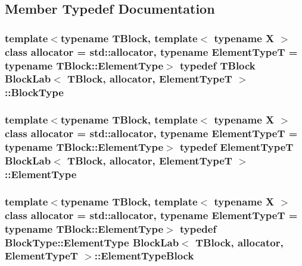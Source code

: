 \subsection{Member Typedef Documentation}
\hypertarget{class_block_lab_a745b3c9ac17f6743d11a7085196981a0}{}
\subsubsection[{Block\+Type}]{\setlength{\rightskip}{0pt plus 5cm}template$<$typename T\+Block, template$<$ typename X $>$ class allocator = std\+::allocator, typename Element\+Type\+T = typename T\+Block\+::\+Element\+Type$>$ typedef T\+Block {\bf Block\+Lab}$<$ T\+Block, allocator, Element\+Type\+T $>$\+::{\bf Block\+Type}\hspace{0.3cm}{\ttfamily [protected]}}\label{class_block_lab_a745b3c9ac17f6743d11a7085196981a0}
\hypertarget{class_block_lab_accdcd2d5e815a8497e5ef9ae884da6b6}{}
\subsubsection[{Element\+Type}]{\setlength{\rightskip}{0pt plus 5cm}template$<$typename T\+Block, template$<$ typename X $>$ class allocator = std\+::allocator, typename Element\+Type\+T = typename T\+Block\+::\+Element\+Type$>$ typedef Element\+Type\+T {\bf Block\+Lab}$<$ T\+Block, allocator, Element\+Type\+T $>$\+::{\bf Element\+Type}}\label{class_block_lab_accdcd2d5e815a8497e5ef9ae884da6b6}
\hypertarget{class_block_lab_ad547d74881a0d226a849e2051af6b26b}{}
\subsubsection[{Element\+Type\+Block}]{\setlength{\rightskip}{0pt plus 5cm}template$<$typename T\+Block, template$<$ typename X $>$ class allocator = std\+::allocator, typename Element\+Type\+T = typename T\+Block\+::\+Element\+Type$>$ typedef Block\+Type\+::\+Element\+Type {\bf Block\+Lab}$<$ T\+Block, allocator, Element\+Type\+T $>$\+::{\bf Element\+Type\+Block}\hspace{0.3cm}{\ttfamily [protected]}}\label{class_block_lab_ad547d74881a0d226a849e2051af6b26b}


